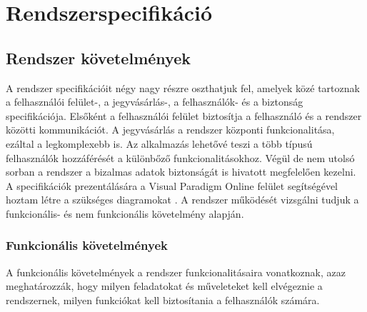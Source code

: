 \chapter{Rendszerspecifikáció} \label{fejezet3}

\section {Rendszer követelmények}

A rendszer specifikációit négy nagy részre oszthatjuk fel, amelyek közé tartoznak a felhasználói felület-, a jegyvásárlás-, a felhasználók- és a biztonság specifikációja. Elsőként a felhasználói felület biztosítja a felhasználó és a rendszer közötti kommunikációt. A jegyvásárlás a rendszer központi funkcionalitása, ezáltal a legkomplexebb is. Az alkalmazás lehetővé teszi a több típusú felhasználók hozzáférését a különbőző funkcionalitásokhoz. Végül de nem utolsó sorban a rendszer a bizalmas adatok biztonságát is hivatott megfelelően kezelni. A specifikációk prezentálására a Visual Paradigm Online felület segítségével hoztam létre a szükséges diagramokat \cite{VPO}. A rendszer működését vizsgálni tudjuk a funkcionális- és nem funkcionális követelmény alapján.
\subsection {Funkcionális követelmények} \label{rendszerFunkcionális}

A funkcionális követelmények a rendszer funkcionalitásaira vonatkoznak, azaz meghatározzák, hogy milyen feladatokat és műveleteket kell elvégeznie a rendszernek, milyen funkciókat kell biztosítania a felhasználók számára.

